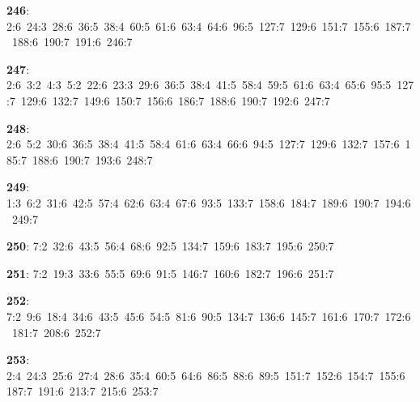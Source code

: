 \noindent \textbf{246}: 2:6\allowbreak\ 24:3\allowbreak\ 28:6\allowbreak\ 36:5\allowbreak\ 38:4\allowbreak\ 60:5\allowbreak\ 61:6\allowbreak\ 63:4\allowbreak\ 64:6\allowbreak\ 96:5\allowbreak\ 127:7\allowbreak\ 129:6\allowbreak\ 151:7\allowbreak\ 155:6\allowbreak\ 187:7\allowbreak\ 188:6\allowbreak\ 190:7\allowbreak\ 191:6\allowbreak\ 246:7\par
\noindent \textbf{247}: 2:6\allowbreak\ 3:2\allowbreak\ 4:3\allowbreak\ 5:2\allowbreak\ 22:6\allowbreak\ 23:3\allowbreak\ 29:6\allowbreak\ 36:5\allowbreak\ 38:4\allowbreak\ 41:5\allowbreak\ 58:4\allowbreak\ 59:5\allowbreak\ 61:6\allowbreak\ 63:4\allowbreak\ 65:6\allowbreak\ 95:5\allowbreak\ 127:7\allowbreak\ 129:6\allowbreak\ 132:7\allowbreak\ 149:6\allowbreak\ 150:7\allowbreak\ 156:6\allowbreak\ 186:7\allowbreak\ 188:6\allowbreak\ 190:7\allowbreak\ 192:6\allowbreak\ 247:7\par
\noindent \textbf{248}: 2:6\allowbreak\ 5:2\allowbreak\ 30:6\allowbreak\ 36:5\allowbreak\ 38:4\allowbreak\ 41:5\allowbreak\ 58:4\allowbreak\ 61:6\allowbreak\ 63:4\allowbreak\ 66:6\allowbreak\ 94:5\allowbreak\ 127:7\allowbreak\ 129:6\allowbreak\ 132:7\allowbreak\ 157:6\allowbreak\ 185:7\allowbreak\ 188:6\allowbreak\ 190:7\allowbreak\ 193:6\allowbreak\ 248:7\par
\noindent \textbf{249}: 1:3\allowbreak\ 6:2\allowbreak\ 31:6\allowbreak\ 42:5\allowbreak\ 57:4\allowbreak\ 62:6\allowbreak\ 63:4\allowbreak\ 67:6\allowbreak\ 93:5\allowbreak\ 133:7\allowbreak\ 158:6\allowbreak\ 184:7\allowbreak\ 189:6\allowbreak\ 190:7\allowbreak\ 194:6\allowbreak\ 249:7\par
\noindent \textbf{250}: 7:2\allowbreak\ 32:6\allowbreak\ 43:5\allowbreak\ 56:4\allowbreak\ 68:6\allowbreak\ 92:5\allowbreak\ 134:7\allowbreak\ 159:6\allowbreak\ 183:7\allowbreak\ 195:6\allowbreak\ 250:7\par
\noindent \textbf{251}: 7:2\allowbreak\ 19:3\allowbreak\ 33:6\allowbreak\ 55:5\allowbreak\ 69:6\allowbreak\ 91:5\allowbreak\ 146:7\allowbreak\ 160:6\allowbreak\ 182:7\allowbreak\ 196:6\allowbreak\ 251:7\par
\noindent \textbf{252}: 7:2\allowbreak\ 9:6\allowbreak\ 18:4\allowbreak\ 34:6\allowbreak\ 43:5\allowbreak\ 45:6\allowbreak\ 54:5\allowbreak\ 81:6\allowbreak\ 90:5\allowbreak\ 134:7\allowbreak\ 136:6\allowbreak\ 145:7\allowbreak\ 161:6\allowbreak\ 170:7\allowbreak\ 172:6\allowbreak\ 181:7\allowbreak\ 208:6\allowbreak\ 252:7\par
\noindent \textbf{253}: 2:4\allowbreak\ 24:3\allowbreak\ 25:6\allowbreak\ 27:4\allowbreak\ 28:6\allowbreak\ 35:4\allowbreak\ 60:5\allowbreak\ 64:6\allowbreak\ 86:5\allowbreak\ 88:6\allowbreak\ 89:5\allowbreak\ 151:7\allowbreak\ 152:6\allowbreak\ 154:7\allowbreak\ 155:6\allowbreak\ 187:7\allowbreak\ 191:6\allowbreak\ 213:7\allowbreak\ 215:6\allowbreak\ 253:7\par
